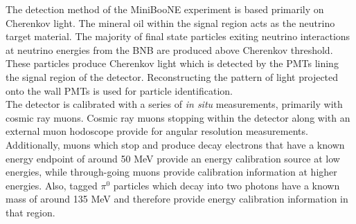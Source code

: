 The detection method of the MiniBooNE experiment is based primarily on Cherenkov light. The mineral oil within the signal region acts as the neutrino target material.  The majority of final state particles exiting neutrino interactions at neutrino energies from the BNB are produced above Cherenkov threshold. These particles produce Cherenkov light which is detected by the PMTs lining the signal region of the detector. Reconstructing the pattern of light projected onto the wall PMTs is used for particle identification.\\




The detector is calibrated with a series of \textit{in situ} measurements, primarily with cosmic ray muons. Cosmic ray muons stopping within the detector along with an external muon hodoscope provide for angular resolution measurements. Additionally, muons which stop and produce decay electrons that have a known energy endpoint of around 50 MeV provide an energy calibration source at low energies, while through-going muons provide calibration information at higher energies. Also, tagged $\pi^0$ particles which decay into two photons have a known mass of around 135 MeV and therefore provide energy calibration information in that region.\\

